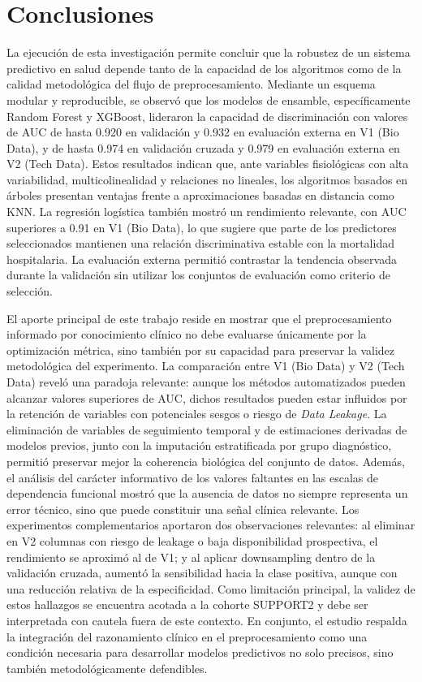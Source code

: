 \section{Conclusiones}\label{sec:conclusiones}

La ejecución de esta investigación permite concluir que la robustez de un sistema
predictivo en salud depende tanto de la capacidad de los algoritmos como de la
calidad metodológica del flujo de preprocesamiento. Mediante un esquema modular
y reproducible, se observó que los modelos de ensamble, específicamente Random
Forest y XGBoost, lideraron la capacidad de discriminación con valores de AUC de
hasta 0.920 en validación y 0.932 en evaluación externa en V1 (Bio Data), y de
hasta 0.974 en validación cruzada y 0.979 en evaluación externa en V2 (Tech
Data). Estos resultados indican que, ante variables fisiológicas con alta
variabilidad, multicolinealidad y relaciones no lineales, los algoritmos
basados en árboles presentan ventajas frente a aproximaciones basadas en
distancia como KNN. La regresión logística también mostró un rendimiento
relevante, con AUC superiores a 0.91 en V1 (Bio Data), lo que sugiere que parte
de los predictores seleccionados mantienen una relación discriminativa estable
con la mortalidad hospitalaria. La evaluación externa permitió contrastar la
tendencia observada durante la validación sin utilizar los conjuntos de
evaluación como criterio de selección.

El aporte principal de este trabajo reside en mostrar que el preprocesamiento
informado por conocimiento clínico no debe evaluarse únicamente por la
optimización métrica, sino también por su capacidad para preservar la validez
metodológica del experimento. La comparación entre V1 (Bio Data) y V2 (Tech
Data) reveló una paradoja relevante: aunque los métodos automatizados pueden
alcanzar valores superiores de AUC, dichos resultados pueden estar influidos
por la retención de variables con potenciales sesgos o riesgo de \textit{Data
Leakage}. La eliminación de variables de
seguimiento temporal y de estimaciones derivadas de modelos previos, junto con
la imputación estratificada por grupo diagnóstico, permitió preservar mejor la
coherencia biológica del conjunto de datos. Además, el análisis del carácter
informativo de los valores faltantes en las escalas de dependencia funcional
mostró que la ausencia de datos no siempre representa un error técnico, sino que
puede constituir una señal clínica relevante. Los experimentos complementarios
aportaron dos observaciones relevantes: al eliminar en V2 columnas con riesgo de
leakage o baja disponibilidad prospectiva, el rendimiento se aproximó al de V1;
y al aplicar downsampling dentro de la validación cruzada, aumentó la
sensibilidad hacia la clase positiva, aunque con una reducción relativa de la
especificidad. Como limitación principal, la
validez de estos hallazgos se encuentra acotada a la cohorte SUPPORT2 y debe ser
interpretada con cautela fuera de este contexto. En conjunto, el estudio
respalda la integración del razonamiento clínico en el preprocesamiento como una
condición necesaria para desarrollar modelos predictivos no solo precisos, sino
también metodológicamente defendibles.
